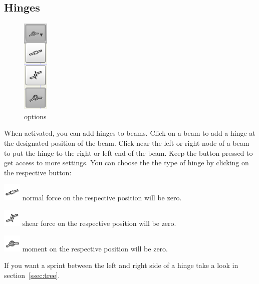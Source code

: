 \documentclass[a4paper,11pt]{report}
\begin{document}
\subsection{Hinges}

\begin{minipage}[h]{4cm}
\begin{figure}[H]
\begin{center}
\includegraphics[scale=0.6]{../pictures/hinge_opt.png}
\caption{options}
\label{pic:hinge_opt}
\end{center}
\end{figure}
\end{minipage}
\begin{minipage}[h]{\textwidth-4cm}
When activated, you can add hinges to beams. Click on a beam to add a hinge at the designated position of the beam. Click near the left or right node of a beam to put the hinge to the right or left end of the beam. Keep the button pressed to get access to more settings. You can choose the the type of hinge by clicking on the respective button:
\begin{trivlist}
	\item[] \includegraphics[scale = 0.5]{../../icons/jointN.png} normal force on the respective position will be zero.
	\item[] \includegraphics[scale = 0.5]{../../icons/jointQ.png} shear force on the respective position will be zero.
	\item[] \includegraphics[scale = 0.5]{../../icons/joint.png} moment on the respective position will be zero.
\end{trivlist}
If you want a sprint between the left and right side of a hinge take a look in section~\ref{ssec:tree}.
\end{minipage}
\end{document}
